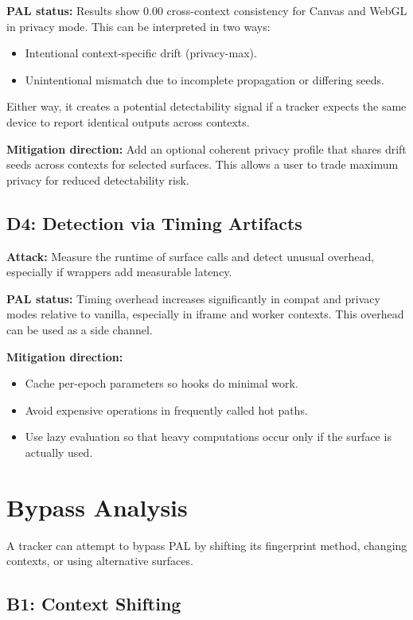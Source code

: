 \documentclass[11pt]{report}
\begin{document}
\textbf{PAL status:} Results show $0.00$ cross-context consistency for Canvas and WebGL in privacy mode. This can be interpreted in two ways:

\begin{itemize}
    \item Intentional context-specific drift (privacy-max).
    \item Unintentional mismatch due to incomplete propagation or differing seeds.
\end{itemize}

Either way, it creates a potential detectability signal if a tracker expects the same device to report identical outputs across contexts.

\textbf{Mitigation direction:} Add an optional coherent privacy profile that shares drift seeds across contexts for selected surfaces. This allows a user to trade maximum privacy for reduced detectability risk.

\subsection{D4: Detection via Timing Artifacts}

\textbf{Attack:} Measure the runtime of surface calls and detect unusual overhead, especially if wrappers add measurable latency.

\textbf{PAL status:} Timing overhead increases significantly in compat and privacy modes relative to vanilla, especially in iframe and worker contexts. This overhead can be used as a side channel.

\textbf{Mitigation direction:}
\begin{itemize}
    \item Cache per-epoch parameters so hooks do minimal work.
    \item Avoid expensive operations in frequently called hot paths.
    \item Use lazy evaluation so that heavy computations occur only if the surface is actually used.
\end{itemize}

\section{Bypass Analysis}

A tracker can attempt to bypass PAL by shifting its fingerprint method, changing contexts, or using alternative surfaces.

\subsection{B1: Context Shifting}
\end{document}

